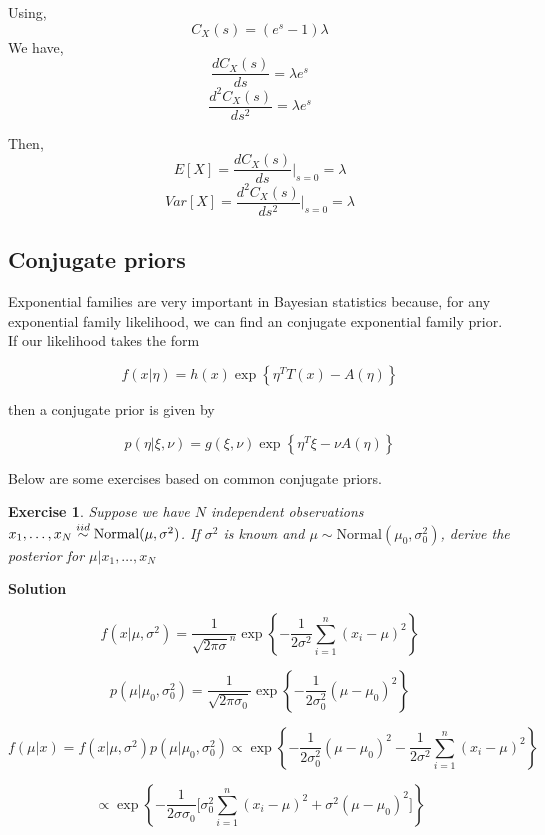 \documentclass[twoside]{article}
\newcounter{lecnum}
\newtheorem{exercise}{Exercise}[lecnum]
\begin{document}
 Using, 
$$ C_{X}(s) = (e^s-1)\lambda $$
We have,
$$ \frac{d C_{X}(s) }{ds}= \lambda e^{s}$$
$$ \frac{d^2 C_{X}(s) }{ds^2}= \lambda e^{s} $$

Then,
$$ E[X]= \frac{d C_{X}(s) }{ds}\Bigr|_{s=0} = \lambda$$
$$ Var[X]= \frac{d^2 C_{X}(s) }{ds^2}\Bigr|_{s=0}= \lambda$$



 \color{black}
\vspace{10mm}

\newpage
\subsection{Conjugate priors}

Exponential families are very important in Bayesian statistics because, for any exponential family likelihood, we can find an conjugate exponential family prior. If our likelihood takes the form

$$f(x|\eta) = h(x)\exp\left\{\eta^TT(x) - A(\eta)\right\}$$

then a conjugate prior is given by

$$p(\eta|\xi,\nu) = g(\xi,\nu)\exp\left\{\eta^T\xi - \nu A(\eta)\right\}$$

Below are some exercises based on common conjugate priors.

\begin{exercise}
  Suppose we have $N$ independent observations $x_1,\dots, x_N \stackrel{\small{iid}}{\sim}\mbox{Normal}(\mu, \sigma^2)$. If $\sigma^2$ is known and $\mu\sim \mbox{Normal}(\mu_0,\sigma_0^2)$, derive the posterior for $\mu|x_1,\dots, x_N$
\end{exercise}

 \color{blue}
\textbf{Solution}

$$ f(x| \mu, \sigma^2) = \frac{1}{ \sqrt {2 \pi \sigma}^n} \exp\left\{ -\frac{1}{2 \sigma^2} \sum_{i=1}^{n} (x_i - \mu)^2 \right\}   $$

$$  p(\mu | \mu_0, \sigma_0^2) = \frac{1}{ \sqrt {2 \pi \sigma_0}} \exp\left\{ -\frac{1}{2 \sigma_0^2} (\mu - \mu_0)^2 \right\}  $$


$$  f(\mu | x) = f(x| \mu, \sigma^2)p(\mu | \mu_0, \sigma_0^2) \propto \exp\left\{ -\frac{1}{2 \sigma_0^2} (\mu - \mu_0)^2  -\frac{1}{2 \sigma^2} \sum_{i=1}^{n} (x_i - \mu)^2 \right\}  $$

$$\propto \exp\left\{  
-\frac{1}{2 \sigma \sigma_0} \bigg[\sigma_0^2 \sum_{i=1}^{n} (x_i - \mu)^2 +  
\sigma^2 (\mu - \mu_0)^2
 \bigg]
\right\} $$
\end{document}
